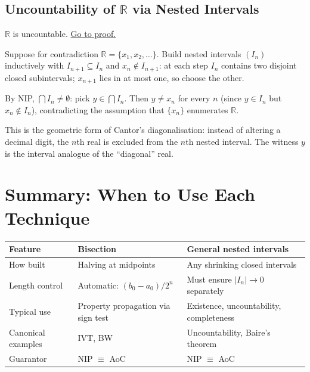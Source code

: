 \subsection*{Uncountability of $\mathbb{R}$ via Nested Intervals}
\label{subsec:uncountable}

\begin{proposition}
\label{prop:r-uncountable}
$\mathbb{R}$ is uncountable.
\hyperref[prf:r-uncountable]{Go to proof.}
\end{proposition}

\begin{remark*}
\end{remark*}


\begin{remark}
Suppose for contradiction $\mathbb{R}=\{x_1,x_2,\ldots\}$. Build nested
intervals $(I_n)$ inductively with $I_{n+1}\subseteq I_n$ and
$x_n\notin I_{n+1}$: at each step $I_n$ contains two disjoint closed
subintervals; $x_{n+1}$ lies in at most one, so choose the other.

By NIP, $\bigcap I_n\neq\emptyset$: pick $y\in\bigcap I_n$. Then
$y\neq x_n$ for every $n$ (since $y\in I_n$ but $x_n\notin I_n$),
contradicting the assumption that $\{x_n\}$ enumerates $\mathbb{R}$.
\end{remark}

\begin{remark}
This is the geometric form of Cantor's diagonalisation: instead of
altering a decimal digit, the $n$th real is excluded from the $n$th nested
interval. The witness $y$ is the interval analogue of the ``diagonal'' real.
\end{remark}

\section*{Summary: When to Use Each Technique}

\begin{remark}
\medskip
\begin{tabular}{@{}lll@{}}
\toprule
\textbf{Feature} & \textbf{Bisection} & \textbf{General nested intervals} \\
\midrule
How built & Halving at midpoints & Any shrinking closed intervals \\
Length control & Automatic: $(b_0-a_0)/2^n$ & Must ensure $|I_n|\to 0$ separately \\
Typical use & Property propagation via sign test & Existence, uncountability, completeness \\
Canonical examples & IVT, BW & Uncountability, Baire's theorem \\
Guarantor & NIP $\equiv$ AoC & NIP $\equiv$ AoC \\
\bottomrule
\end{tabular}
\end{remark}

